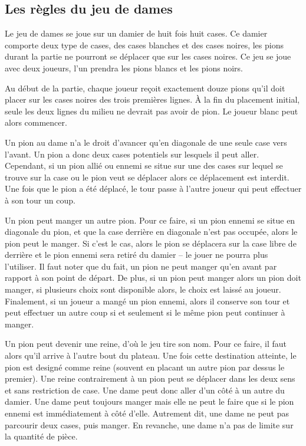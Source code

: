 \documentclass[a4paper,11pt]{article}
\begin{document}
\begin{multicols}{2}[]
  \subsection{Les règles du jeu de dames}

    Le jeu de dames se joue sur un damier de huit fois huit cases. Ce damier
    comporte deux type de cases, des cases blanches et des cases noires, les
    pions durant la partie ne pourront se déplacer que sur les cases noires. Ce
    jeu se joue avec deux joueurs, l'un prendra les pions blancs et les pions
    noirs.

    Au début de la partie, chaque joueur reçoit exactement douze pions qu'il
    doit placer sur les cases noires des trois premières lignes. À la fin du
    placement initial, seule les deux lignes du milieu ne devrait pas avoir de
    pion. Le joueur blanc peut alors commencer.

    Un pion au dame n'a le droit d'avancer qu'en diagonale de une seule case
    vers l'avant. Un pion a donc deux cases potentiels sur lesquels il peut
    aller.  Cependant, si un pion allié ou ennemi se situe sur une des cases
    sur lequel se trouve sur la case ou le pion veut se déplacer alors ce
    déplacement est interdit. Une fois que le pion a été déplacé, le tour passe
    à l'autre joueur qui peut effectuer à son tour un coup.

    Un pion peut manger un autre pion. Pour ce faire, si un pion ennemi se
    situe en diagonale du pion, et que la case derrière en diagonale n'est pas
    occupée, alors le pion peut le manger. Si c'est le cas, alors le pion se
    déplacera sur la case libre de derrière et le pion ennemi sera retiré du
    damier -- le jouer ne pourra plus l'utiliser. Il faut noter que du fait, un
    pion ne peut manger qu'en avant par rapport à son point de départ. De plus,
    si un pion peut manger alors un pion doit manger, si plusieurs choix sont
    disponible alors, le choix est laissé au joueur. Finalement, si un joueur a
    mangé un pion ennemi, alors il conserve son tour et peut effectuer un autre
    coup si et seulement si le même pion peut continuer à manger.

    Un pion peut devenir une reine, d'où le jeu tire son nom. Pour ce faire, il
    faut alors qu'il arrive à l'autre bout du plateau. Une fois cette
    destination atteinte, le pion est designé comme reine (souvent en placant
    un autre pion par dessus le premier). Une reine contrairement à un pion
    peut se déplacer dans les deux sens et sans restriction de case. Une dame
    peut donc aller d'un côté à un autre du damier. Une dame peut toujours
    manger mais elle ne peut le faire que si le pion ennemi est immédiatement à
    côté d'elle. Autrement dit, une dame ne peut pas parcourir deux cases, puis
    manger. En revanche, une dame n'a pas de limite sur la quantité de pièce.


\end{multicols}
\end{document}
